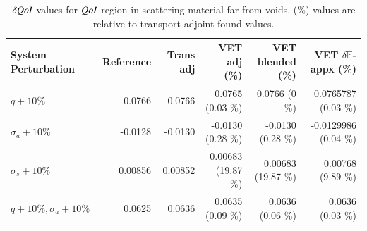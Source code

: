 \documentclass{anstrans}
\newcommand{\Edd}{\mathbb{E}}
\newcommand{\sigs}{\sigma_s}
\newcommand{\siga}{\sigma_a}
\newcommand{\qoi}{{\it QoI}\xspace}
\begin{document}
\begin{table}
  \centering
  \caption{$\delta \qoi$ values for $\qoi$ region in scattering material far from voids. ($\%$) values are relative to transport adjoint found values.}
  \begin{tabular}{l|rr|rrr}\toprule
  System Perturbation    & Reference     & Trans adj     & VET adj \hspace{1mm} (\%)    &   VET blended \hspace{1mm} (\%)   & VET $\delta \Edd$-appx  \hspace{1mm} (\%) 
\\ \midrule
$q+10\%$  & 0.0766  & 0.0766  & 0.0765 \hspace{1mm} (0.03 \%)  & 0.0766   \hspace{1mm} (0 \%) & 0.0765787  \hspace{1mm} (0.03 \%)
\\
$\siga+10\%$  &-0.0128  & -0.0130 & -0.0130   \hspace{1mm} (0.28 \%) & -0.0130  \hspace{1mm} (0.28 \%) & -0.0129986  \hspace{1mm} (0.04 \%) 
\\
$\sigs+10\%$  & 0.00856  & 0.00852  & 0.00683  \hspace{1mm} (19.87 \%)  & 0.00683   \hspace{1mm} (19.87 \%) & 0.00768   \hspace{1mm} (9.89 \%)
\\
$q+10\%,\siga+10\%$  & 0.0625 & 0.0636  & 0.0635 \hspace{1mm} (0.09 \%) & 0.0636 \hspace{1mm} (0.06 \%)  &  0.0636  \hspace{1mm} (0.03 \%)
\\
\bottomrule
\end{tabular}
  \label{tab:qoi1}
\end{table}
\end{document}
